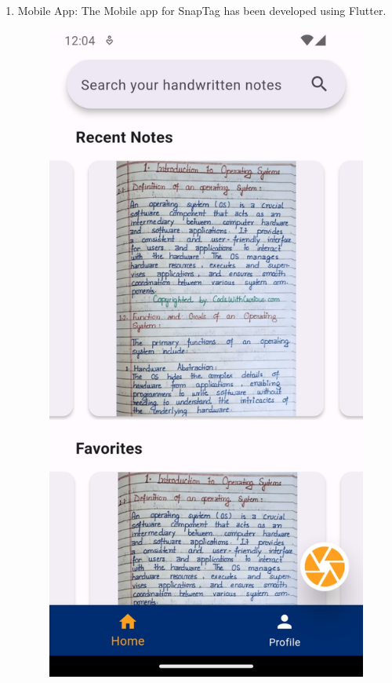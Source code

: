\begin{enumerate}
\begin{figure}[h]
    \end{figure}
    \newpage
\newpage
    \item Mobile App: The Mobile app for SnapTag has been developed using Flutter.
    \begin{figure}[h!]
        \centering
        \includegraphics[scale=0.3]{output/home.jpg}

\end{figure}
\end{enumerate}
